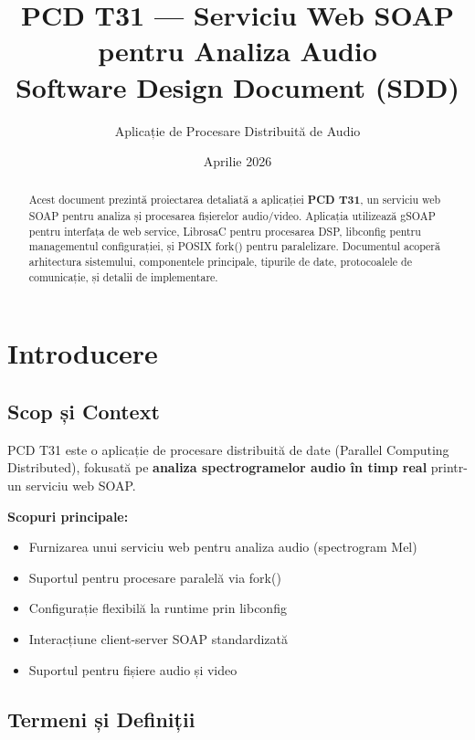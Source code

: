 \documentclass[12pt,a4paper,twoside]{article}
\title{\textbf{PCD T31 --- Serviciu Web SOAP pentru Analiza Audio} \\
        \large{Software Design Document (SDD)}}
\author{Aplicație de Procesare Distribuită de Audio}
\date{Aprilie 2026}
\begin{document}
\maketitle

\begin{abstract}
    Acest document prezintă proiectarea detaliată a aplicației \textbf{PCD T31}, 
    un serviciu web SOAP pentru analiza și procesarea fișierelor audio/video. 
    Aplicația utilizează gSOAP pentru interfața de web service, LibrosaC pentru 
    procesarea DSP, libconfig pentru managementul configurației, și POSIX fork() 
    pentru paralelizare. Documentul acoperă arhitectura sistemului, componentele 
    principale, tipurile de date, protocoalele de comunicație, și detalii de implementare.
\end{abstract}

\newpage
\tableofcontents
\newpage

\section{Introducere}

\subsection{Scop și Context}

PCD T31 este o aplicație de procesare distribuită de date (Parallel Computing Distributed), 
fokusată pe \textbf{analiza spectrogramelor audio în timp real} printr-un serviciu web SOAP.

\textbf{Scopuri principale:}
\begin{itemize}
    \item Furnizarea unui serviciu web pentru analiza audio (spectrogram Mel)
    \item Suportul pentru procesare paralelă via fork()
    \item Configurație flexibilă la runtime prin libconfig
    \item Interacțiune client-server SOAP standardizată
    \item Suportul pentru fișiere audio și video
\end{itemize}

\subsection{Termeni și Definiții}
\end{document}
